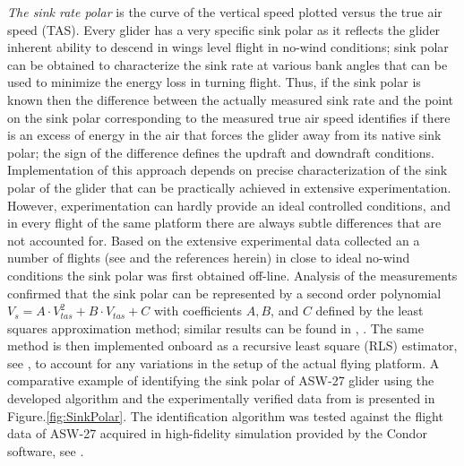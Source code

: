 \documentclass{ifacconf}
\begin{document}
\emph{The sink rate polar} is the curve of the vertical speed plotted versus the true air speed (TAS). Every glider has a very specific sink polar as it reflects the glider inherent ability to descend in wings level flight in no-wind conditions; sink polar can be obtained to characterize the sink rate at various bank angles that can be used to minimize the energy loss in turning flight. Thus, if the sink polar is known then the difference between the actually measured sink rate and the point on the sink polar corresponding to the measured true air speed identifies if there is an excess of energy in the air that forces the glider away from its native sink polar; the sign of the difference defines the updraft and downdraft conditions. Implementation of this approach depends on precise characterization of the sink polar of the glider that can be practically achieved in extensive experimentation. However, experimentation can hardly provide an ideal controlled conditions, and in every flight of the same platform there are always subtle differences that are not accounted for. Based on the extensive experimental data collected an a number of flights (see \cite{AKlass_JGCD:2012} and the references herein) in close to ideal no-wind conditions the sink polar was first obtained off-line. Analysis of the measurements confirmed that the sink polar can be represented by a second order polynomial $V_s=A \cdot V_{tas}^2 + B \cdot V_{tas} +C$ with coefficients $A, B$, and $C$ defined by the least squares approximation method; similar results can be found in \cite{Reichmann:1978}, \cite{Edwards:2008}. The same method is then implemented onboard as a recursive least square (RLS) estimator, see \cite{Astrom:1995}, to account for any variations in the setup of the actual flying platform. A comparative example of identifying the sink polar of ASW-27 glider using the developed algorithm and the experimentally verified data  from \cite{Boermans:1994} is presented in Figure.\ref{fig:SinkPolar}. The identification algorithm was tested against the flight data  of ASW-27 acquired in high-fidelity simulation provided by the Condor software, see \cite{Condor:2013:Online}. 
\end{document}
